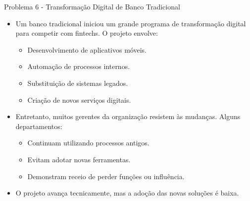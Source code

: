 \documentclass{beamer}
\begin{document}
\begin{frame}{Problema 6 - Transformação Digital de Banco Tradicional}
	\begin{itemize}
		\justifying
		\item Um banco tradicional iniciou um grande programa de transformação digital para competir com fintechs. O projeto envolve:
			\begin{itemize}
				\justifying
				\item Desenvolvimento de aplicativos móveis.
				\item Automação de processos internos.
				\item Substituição de sistemas legados.
				\item Criação de novos serviços digitais.
			\end{itemize}
		\item Entretanto, muitos gerentes da organização resistem às mudanças. Alguns departamentos:
			\begin{itemize}
				\justifying
				\item Continuam utilizando processos antigos.
				\item Evitam adotar novas ferramentas.
				\item Demonstram receio de perder funções ou influência.
			\end{itemize}
		\item O projeto avança tecnicamente, mas a adoção das novas soluções é baixa.
	\end{itemize}
\end{frame}
\end{document}
